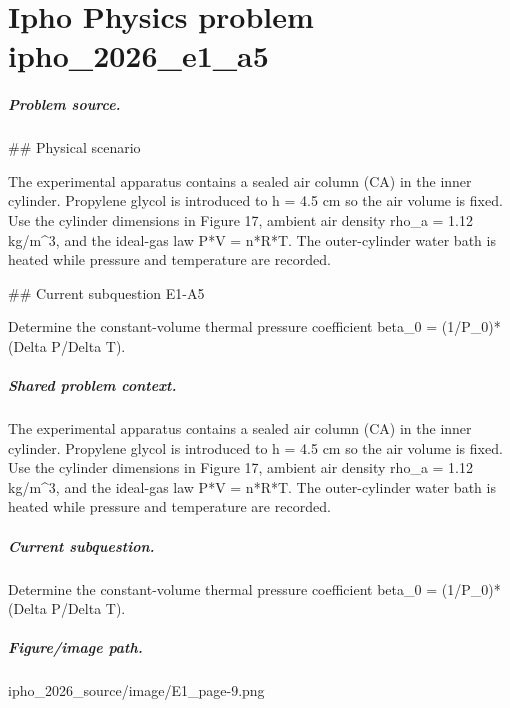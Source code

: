 
\chapter{Ipho Physics problem ipho\_2026\_e1\_a5}
\label{ch:IPhO2026Problems_problem_ipho_2026_e1_a5}

\paragraph{Problem source.}
\#\# Physical scenario

The experimental apparatus contains a sealed air column (CA) in the inner
cylinder.  Propylene glycol is introduced to h = 4.5 cm so the air volume is
fixed.  Use the cylinder dimensions in Figure 17, ambient air density
rho\_a = 1.12 kg/m\textasciicircum{}3, and the ideal-gas law P*V = n*R*T.  The outer-cylinder
water bath is heated while pressure and temperature are recorded.

\#\# Current subquestion E1-A5

Determine the constant-volume thermal pressure coefficient beta\_0 = (1/P\_0)*(Delta P/Delta T).

\paragraph{Shared problem context.}
The experimental apparatus contains a sealed air column (CA) in the inner
cylinder.  Propylene glycol is introduced to h = 4.5 cm so the air volume is
fixed.  Use the cylinder dimensions in Figure 17, ambient air density
rho\_a = 1.12 kg/m\textasciicircum{}3, and the ideal-gas law P*V = n*R*T.  The outer-cylinder
water bath is heated while pressure and temperature are recorded.

\paragraph{Current subquestion.}
Determine the constant-volume thermal pressure coefficient beta\_0 = (1/P\_0)*(Delta P/Delta T).

\paragraph{Figure/image path.}
ipho\_2026\_source/image/E1\_page-9.png


